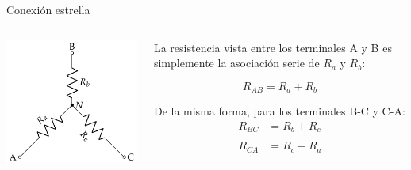 \documentclass[aspectratio=169, xcolor={usenames,svgnames,dvipsnames}]{beamer}
\begin{document}

\begin{frame}{Conexión estrella}
    \begin{columns}
    \begin{column}{0.4\columnwidth}
    \begin{center}
    \includegraphics[width=1.1\linewidth]{../figs/Conexion_Estrella.pdf}
    \end{center}
    \end{column}
    \begin{column}{0.5\columnwidth}
    La resistencia \alert{vista entre los terminales} A y B es simplemente la asociación serie de $R_{a}$ y $R_{b}$:
    
    \begin{equation*}
        R_{AB} = R_a + R_b
    \end{equation*}    
    \vspace{1mm}
    
    De la misma forma, para los terminales B-C y C-A:  
    \begin{align*}
      R_{BC} &= R_b + R_c\\
      \\
      R_{CA} &= R_c + R_a\\
    \end{align*}
    \end{column}
    \end{columns}
\end{frame}
\end{document}

